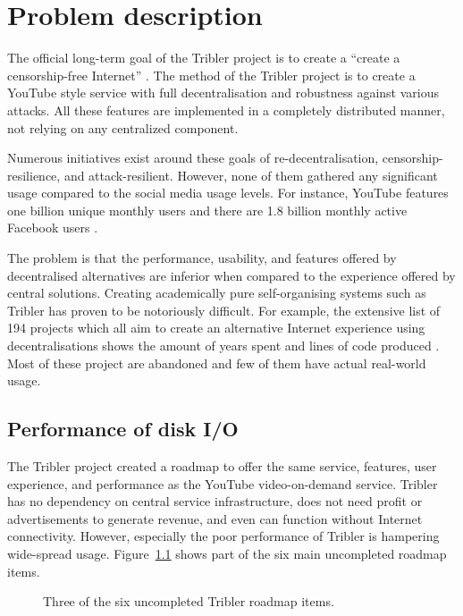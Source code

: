 \chapter{Problem description}
\label{chp:problem-description}

The official long-term goal of the Tribler project is to create a \enquote{create a censorship-free Internet} \cite{pouwelse2012moving}.
The method of the Tribler project is to create a YouTube style service with full decentralisation and robustness against various attacks.
All these features are implemented in a completely distributed manner, not relying on any centralized component.

Numerous initiatives exist around these goals of re-decentralisation, censorship-resilience, and attack-resilient.
However, none of them gathered any significant usage compared to the social media usage levels. 
For instance, YouTube features one billion unique monthly users \cite{mainka2014government} and there are 1.8 billion monthly active Facebook users \cite{sharma2016strategies}.

The problem is that the performance, usability, and features offered by decentralised alternatives are inferior when compared to the experience offered by central solutions.
Creating academically pure self-organising systems such as Tribler has proven to be notoriously difficult.
For example, the extensive list of 194 projects which all aim to create an alternative Internet experience using decentralisations shows the amount of years spent and lines of code produced \cite{redecentralize2016alternative}.
Most of these project are abandoned and few of them have actual real-world usage.

\section{Performance of disk I/O}
The Tribler project created a roadmap to offer the same service, features, user experience, and performance as the YouTube video-on-demand service.
Tribler has no dependency on central service infrastructure, does not need profit or advertisements to generate revenue, and even can function without Internet connectivity. However, especially the poor performance of Tribler is hampering wide-spread usage. Figure~\ref{fig:tribler_roadmap} shows part of the six main uncompleted roadmap items.

\begin{figure}[h]
	\caption{Three of the six uncompleted Tribler roadmap items.}
	\label{fig:tribler_roadmap}
\end{figure}

